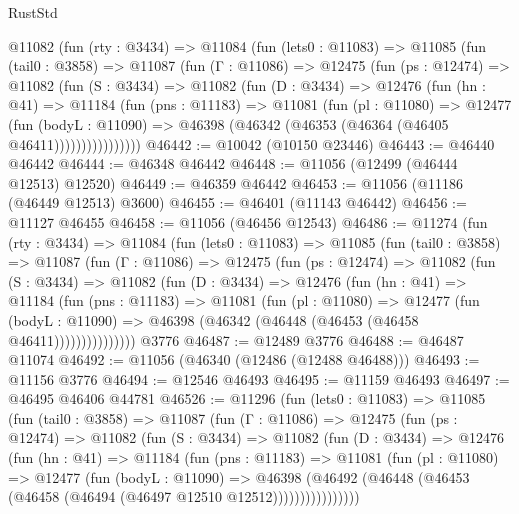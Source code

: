 \begin{lexlean}{RustStd}
\begin{coremodule}
    @11082
      (fun (rty : @3434) =>
      @11084
        (fun (lets0 : @11083) =>
        @11085
          (fun (tail0 : @3858) =>
          @11087
            (fun (Γ : @11086) =>
            @12475
              (fun (ps : @12474) =>
              @11082
                (fun (S : @3434) =>
                @11082
                  (fun (D : @3434) =>
                  @12476
                    (fun (hn : @41) =>
                    @11184
                      (fun (pns : @11183) =>
                      @11081
                        (fun (pl : @11080) =>
                        @12477
                          (fun (bodyL : @11090) =>
                          @46398 (@46342 (@46353 (@46364 (@46405 @46411))))))))))))))))
@46442 := @10042 (@10150 @23446)
@46443 := @46440 @46442
@46444 := @46348 @46442
@46448 := @11056 (@12499 (@46444 @12513) @12520)
@46449 := @46359 @46442
@46453 := @11056 (@11186 (@46449 @12513) @3600)
@46455 := @46401 (@11143 @46442)
@46456 := @11127 @46455
@46458 := @11056 (@46456 @12543)
@46486 := @11274
    (fun (rty : @3434) =>
    @11084
      (fun (lets0 : @11083) =>
      @11085
        (fun (tail0 : @3858) =>
        @11087
          (fun (Γ : @11086) =>
          @12475
            (fun (ps : @12474) =>
            @11082
              (fun (S : @3434) =>
              @11082
                (fun (D : @3434) =>
                @12476
                  (fun (hn : @41) =>
                  @11184
                    (fun (pns : @11183) =>
                    @11081
                      (fun (pl : @11080) =>
                      @12477
                        (fun (bodyL : @11090) =>
                        @46398 (@46342 (@46448 (@46453 (@46458 @46411)))))))))))))))
    @3776
@46487 := @12489 @3776
@46488 := @46487 @11074
@46492 := @11056 (@46340 (@12486 (@12488 @46488)))
@46493 := @11156 @3776
@46494 := @12546 @46493
@46495 := @11159 @46493
@46497 := @46495 @46406 @44781
@46526 := @11296
    (fun (lets0 : @11083) =>
    @11085
      (fun (tail0 : @3858) =>
      @11087
        (fun (Γ : @11086) =>
        @12475
          (fun (ps : @12474) =>
          @11082
            (fun (S : @3434) =>
            @11082
              (fun (D : @3434) =>
              @12476
                (fun (hn : @41) =>
                @11184
                  (fun (pns : @11183) =>
                  @11081
                    (fun (pl : @11080) =>
                    @12477
                      (fun (bodyL : @11090) =>
                      @46398
                        (@46492
                          (@46448 (@46453 (@46458 (@46494 (@46497 @12510 @12512))))))))))))))))

\end{coremodule}
\end{lexlean}
